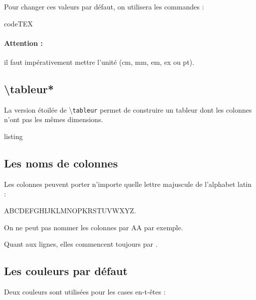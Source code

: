 \documentclass[a4paper,french]{article}
\begin{document}
\medskip

Pour changer ces valeurs par d\'efaut, on utilisera les commandes :

\medskip

\begin{tcblisting}{codeTEX}
\tabcolwidth{2cm} %
\tabnumlinewidth{1cm} %
\tablineheight{15mm} %
\end{tcblisting}

\paragraph*{Attention :} il faut imp\'erativement mettre l'unit\'e (cm, mm, em, ex ou pt).

\subsection{\textbackslash tableur*}

La version \'etoil\'ee de \textbackslash\texttt{tableur} permet de construire un tableur dont les colonnes n'ont pas les m\^emes dimensions.


\begin{tcblisting}{listing}
\end{tcblisting}

\newpage

\subsection{Les noms de colonnes}

Les colonnes peuvent porter n'importe quelle lettre majuscule de l'alphabet latin :

ABCDEFGHIJKLMNOPKRSTUVWXYZ.

On ne peut pas nommer les colonnes par \og AA \fg{} par exemple.

\medskip

Quant aux lignes, elles commencent toujours par  \fg.


\subsection{Les couleurs par d\'efaut}

Deux couleurs sont utilis\'ees pour les cases \og en-t-\^etes \fg{} :
\end{document}
